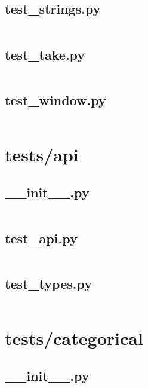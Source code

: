 \documentclass{article}
\begin{document}
\subsection{test\_strings.py}
\inputminted{python}{/home/dufferzafar/dev/@clones/pandas/pandas/tests/test_strings.py}
\newpage

\subsection{test\_take.py}
\inputminted{python}{/home/dufferzafar/dev/@clones/pandas/pandas/tests/test_take.py}
\newpage

\subsection{test\_window.py}
\inputminted{python}{/home/dufferzafar/dev/@clones/pandas/pandas/tests/test_window.py}
\newpage

\section{tests/api}

\subsection{\_\_init\_\_.py}
\inputminted{python}{/home/dufferzafar/dev/@clones/pandas/pandas/tests/api/__init__.py}
\newpage

\subsection{test\_api.py}
\inputminted{python}{/home/dufferzafar/dev/@clones/pandas/pandas/tests/api/test_api.py}
\newpage

\subsection{test\_types.py}
\inputminted{python}{/home/dufferzafar/dev/@clones/pandas/pandas/tests/api/test_types.py}
\newpage

\section{tests/categorical}

\subsection{\_\_init\_\_.py}
\inputminted{python}{/home/dufferzafar/dev/@clones/pandas/pandas/tests/categorical/__init__.py}
\newpage
\end{document}
